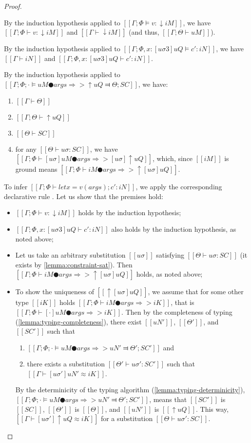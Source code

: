 \begin{proof}
\begin{caseof}
        By the induction hypothesis applied to $[[Γ; Φ ⊨ v : ↓iM]]$, we have    
        $[[Γ; Φ ⊢ v : ↓iM]]$ and $[[Γ ⊢ ↓iM]]$ (and thus, $[[Γ ; Θ  ⊢ uM]]$).
       
        By the induction hypothesis applied to $[[Γ; Φ, x:[uσ3]uQ ⊨ c' : iN]]$, we have
        $[[Γ ⊢ iN]]$ and $[[Γ; Φ, x:[uσ3]uQ ⊢ c' : iN]]$.

        By the induction hypothesis applied to 
        $[[Γ ; Φ ; · ⊨ uM ● args ⇒> ↑uQ ⫤ Θ; SC]]$, we have:
        \begin{enumerate}
            \item $[[Γ ⊢ Θ]]$
            \item $[[Γ; Θ ⊢ ↑uQ]]$
            \item $[[Θ ⊢ SC]]$
            \item for any $[[Θ ⊢ uσ : SC]]$, we have $[[ Γ ; Φ ⊢ [uσ]uM ● args ⇒> [uσ]↑uQ ]]$, 
                which, since  $[[iM]]$ is ground means $[[ Γ ; Φ ⊢ iM ● args ⇒> ↑[uσ]uQ]]$.
        \end{enumerate}

        To infer $[[Γ ; Φ ⊢ let x = v(args) ; c' : iN ]]$, 
        we apply the corresponding 
        declarative rule .
        Let us show that the premises hold:
        \begin{itemize}
            \item $[[Γ; Φ ⊢ v : ↓iM]]$ holds by the induction hypothesis;
            \item $[[Γ; Φ, x:[uσ3]uQ ⊢ c' : iN]]$ also holds by the induction hypothesis, as noted above;
            \item Let us take an arbitrary substitution $[[uσ]]$ 
                satisfying $[[Θ ⊢ uσ : SC]]$ (it exists by \cref{lemma:constraint-sat}).
                Then $[[Γ; Φ ⊢ iM ● args ⇒> ↑[uσ]uQ ]]$ holds, as noted above;
            \item To show the uniqueness of $[[↑[uσ]uQ]]$,
                we assume that for some other type $[[iK]]$ 
                holds $[[Γ; Φ ⊢ iM ● args ⇒> iK ]]$,
                that is $[[Γ; Φ ⊢ [·]uM ● args ⇒> iK ]]$.
                Then by the completeness of typing 
                (\cref{lemma:typing-completeness}),
                there exist $[[uN']]$, $[[Θ']]$, and $[[SC']]$ such that
                \begin{enumerate}
                    \item $[[ Γ; Φ; · ⊨ uM ● args ⇒> uN' ⫤ Θ'; SC' ]]$ and
                    \item there exists a substitution $[[Θ' ⊢ uσ' : SC']]$ such that
                    $[[Γ ⊢ [uσ']uN' ≈ iK]]$.
                \end{enumerate}
            By the determinicity of the typing algorithm (\cref{lemma:typing-determinicity}),
            $[[ Γ; Φ; · ⊨ uM ● args ⇒> uN' ⫤ Θ'; SC' ]]$,
            means that $[[SC']]$ is $[[SC]]$, $[[Θ']]$ is $[[Θ]]$, and $[[uN']]$ is
            $[[↑uQ]]$. 
            This way, $[[Γ ⊢ [uσ']↑uQ ≈ iK]]$ for a substitution 
            $[[Θ ⊢ uσ' : SC]]$. 


\end{itemize}
\end{caseof}
\end{proof}
